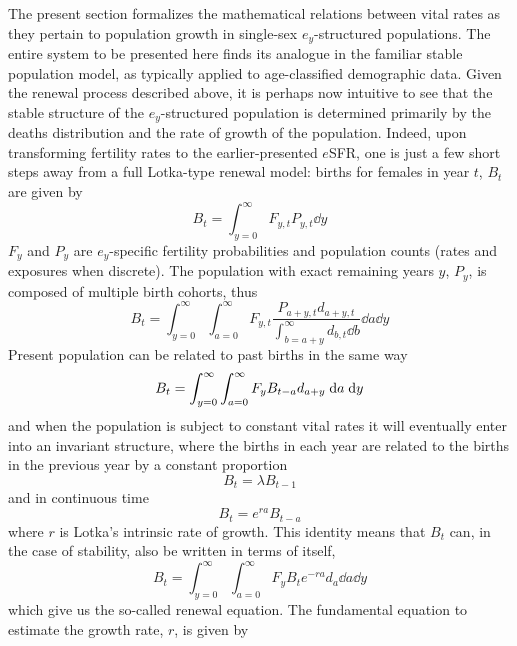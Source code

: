  \FloatBarrier
 \label{sec:ex1sexequation}
The present section formalizes the mathematical relations between vital
rates as they pertain to population growth in single-sex $e_y$-structured
populations. The entire system to be presented here finds its analogue in the
familiar stable population model, as typically applied to age-classified
demographic data. Given the renewal process described above, it is perhaps now
intuitive to see that the stable structure of the $e_y$-structured population is determined
primarily by the deaths distribution and the rate of growth of the
population. Indeed, upon transforming fertility rates to the earlier-presented
$e$SFR, one is just a few short steps away from a full Lotka-type renewal
model: births for females in year $t$, $B_{t}$ are given by
\begin{equation}
B_t = \int_{y=0}^\infty F_{y,t} P_{y,t} \dd y
\end{equation}
$F_y$ and $P_y$ are $e_y$-specific fertility probabilities and population
counts (rates and exposures when discrete). The population with
exact remaining years $y$, $P_y$, is composed of multiple birth cohorts, thus
\begin{equation}
B_t = \int_{y=0}^\infty \int_{a=0}^\infty F_{y,t}
\frac{P_{a+y,t}d_{a+y,t}}{\int_{b=a+y}^\infty d_{b,t} \dd b} \dd a \dd y
\end{equation}
Present population can be related to past
births in the same way
\begin{equation}
B_t = \int_{y=0}^\infty \int_{a=0}^\infty F_y B_{t-a}d_{a+y} \; \mathrm{d} a \; \mathrm{d} y \notag
\end{equation}
and when the population is subject to constant vital rates it will eventually
enter into an invariant structure, where the births in each year are related to
the births in the previous year by a constant proportion
\begin{equation}
B_t = \lambda B_{t-1}
\end{equation}
and in continuous time
\begin{equation}
B_t = e^{ra}B_{t-a}
\end{equation}
where $r$ is Lotka's intrinsic rate of growth. This identity means that $B_t$
can, in the case of stability, also be written in terms of itself,
\begin{equation}
\label{eq:exrenewal1sex}
B_t = \int_{y=0}^\infty \int_{a=0}^\infty F_y B_{t}e^{-ra}d_{a}\dd a \dd y
\end{equation}
which give us the so-called renewal equation. The fundamental equation to
estimate the growth rate, $r$, is given by
